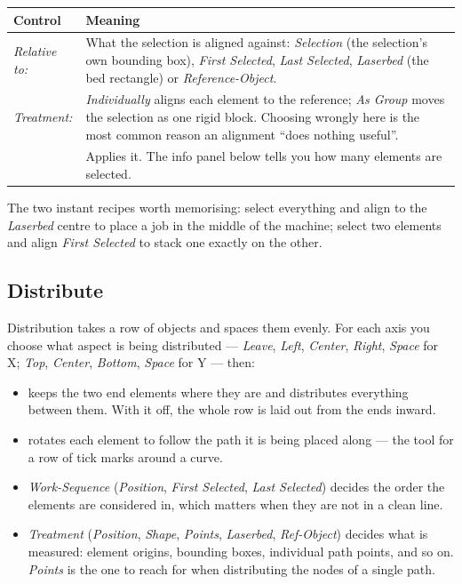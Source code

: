 \begin{center}\small
\begin{tabular}{@{}L{3.1cm}L{11.1cm}@{}}
\toprule
\textbf{Control} & \textbf{Meaning} \\
\midrule
\emph{Relative to:} & What the selection is aligned against: \emph{Selection}
(the selection's own bounding box), \emph{First Selected}, \emph{Last Selected},
\emph{Laserbed} (the bed rectangle) or \emph{Reference-Object}. \\
\emph{Treatment:} & \emph{Individually} aligns each element to the reference;
\emph{As Group} moves the selection as one rigid block. Choosing wrongly here is
the most common reason an alignment ``does nothing useful''. \\
 & Applies it. The info panel below tells you how many elements are
selected. \\
\bottomrule
\end{tabular}
\end{center}

\noindent The two instant recipes worth memorising: select everything and align
to the \emph{Laserbed} centre to place a job in the middle of the machine; select
two elements and align \emph{First Selected} to stack one exactly on the other.

\subsection*{Distribute}

Distribution takes a row of objects and spaces them evenly. For each axis you
choose what aspect is being distributed --- \emph{Leave}, \emph{Left},
\emph{Center}, \emph{Right}, \emph{Space} for X; \emph{Top}, \emph{Center},
\emph{Bottom}, \emph{Space} for Y --- then:

\begin{itemize}
  \item {} keeps the two end elements where they are
        and distributes everything between them. With it off, the whole row is
        laid out from the ends inward.
  \item {} rotates each element to follow the path it is being placed
        along --- the tool for a row of tick marks around a curve.
  \item \emph{Work-Sequence} (\emph{Position}, \emph{First Selected},
        \emph{Last Selected}) decides the order the elements are considered in,
        which matters when they are not in a clean line.
  \item \emph{Treatment} (\emph{Position}, \emph{Shape}, \emph{Points},
        \emph{Laserbed}, \emph{Ref-Object}) decides what is measured: element
        origins, bounding boxes, individual path points, and so on. \emph{Points}
        is the one to reach for when distributing the nodes of a single path.
\end{itemize}

